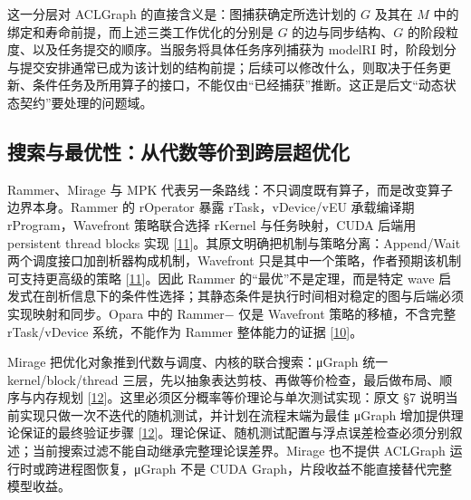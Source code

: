 \documentclass[
  UTF8,
  zihao=5]{ctexart}
\begin{document}
这一分层对 ACLGraph 的直接含义是：图捕获确定所选计划的 \(G\) 及其在
\(M\) 中的绑定和寿命前提，而上述三类工作优化的分别是 \(G\)
的边与同步结构、\(G\)
的阶段粒度、以及任务提交的顺序。当服务将具体任务序列捕获为 modelRI
时，阶段划分与提交安排通常已成为该计划的结构前提；后续可以修改什么，则取决于任务更新、条件任务及所用算子的接口，不能仅由``已经捕获''推断。这正是后文``动态状态契约''要处理的问题域。

\hypertarget{ux641cux7d22ux4e0eux6700ux4f18ux6027ux4eceux4ee3ux6570ux7b49ux4ef7ux5230ux8de8ux5c42ux8d85ux4f18ux5316}{%
\subsection{搜索与最优性：从代数等价到跨层超优化}\label{ux641cux7d22ux4e0eux6700ux4f18ux6027ux4eceux4ee3ux6570ux7b49ux4ef7ux5230ux8de8ux5c42ux8d85ux4f18ux5316}}

Rammer、Mirage 与 MPK
代表另一条路线：不只调度既有算子，而是改变算子边界本身。Rammer 的
rOperator 暴露 rTask，vDevice/vEU 承载编译期 rProgram，Wavefront
策略联合选择 rKernel 与任务映射，CUDA 后端用 persistent thread blocks
实现
{[}\protect\hyperlink{ref-ma2020rammer}{11}{]}。其原文明确把机制与策略分离：Append/Wait
两个调度接口加剖析器构成机制，Wavefront
只是其中一个策略，作者预期该机制可支持更高级的策略
{[}\protect\hyperlink{ref-ma2020rammer}{11}{]}。因此 Rammer
的``最优''不是定理，而是特定 wave
启发式在剖析信息下的条件性选择；其静态条件是执行时间相对稳定的图与后端必须实现映射和同步。Opara
中的 Rammer− 仅是 Wavefront 策略的移植，不含完整 rTask/vDevice
系统，不能作为 Rammer 整体能力的证据
{[}\protect\hyperlink{ref-chen2025opara}{10}{]}。

Mirage 把优化对象推到代数与调度、内核的联合搜索：μGraph 统一
kernel/block/thread
三层，先以抽象表达剪枝、再做等价检查，最后做布局、顺序与内存规划
{[}\protect\hyperlink{ref-wu2025mirage}{12}{]}。这里必须区分概率等价理论与单次测试实现：原文
§7 说明当前实现只做一次不迭代的随机测试，并计划在流程末端为最佳 μGraph
增加提供理论保证的最终验证步骤
{[}\protect\hyperlink{ref-wu2025mirage}{12}{]}。理论保证、随机测试配置与浮点误差检查必须分别叙述；当前搜索过滤不能自动继承完整理论误差界。Mirage
也不提供 ACLGraph 运行时或跨进程图恢复，μGraph 不是 CUDA
Graph，片段收益不能直接替代完整模型收益。
\end{document}
